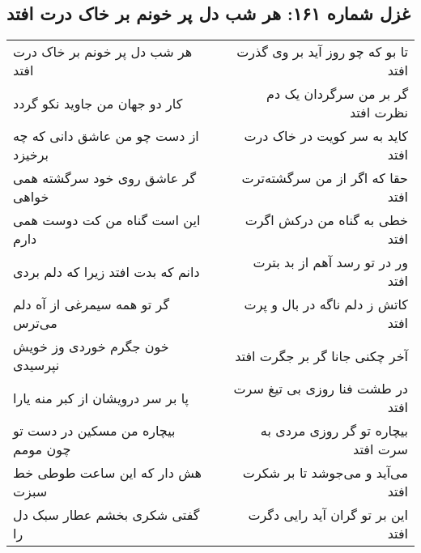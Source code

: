 \begin{center}
\section*{غزل شماره ۱۶۱: هر شب دل پر خونم بر خاک درت افتد}
\label{sec:161}
\begin{longtable}{l p{0.5cm} r}
هر شب دل پر خونم بر خاک درت افتد
&&
تا بو که چو روز آید بر وی گذرت افتد
\\
کار دو جهان من جاوید نکو گردد
&&
گر بر من سرگردان یک دم نظرت افتد
\\
از دست چو من عاشق دانی که چه برخیزد
&&
کاید به سر کویت در خاک درت افتد
\\
گر عاشق روی خود سرگشته همی خواهی
&&
حقا که اگر از من سرگشته‌ترت افتد
\\
این است گناه من کت دوست همی دارم
&&
خطی به گناه من درکش اگرت افتد
\\
دانم که بدت افتد زیرا که دلم بردی
&&
ور در تو رسد آهم از بد بترت افتد
\\
گر تو همه سیمرغی از آه دلم می‌ترس
&&
کاتش ز دلم ناگه در بال و پرت افتد
\\
خون جگرم خوردی وز خویش نپرسیدی
&&
آخر چکنی جانا گر بر جگرت افتد
\\
پا بر سر درویشان از کبر منه یارا
&&
در طشت فنا روزی بی تیغ سرت افتد
\\
بیچاره من مسکین در دست تو چون مومم
&&
بیچاره تو گر روزی مردی به سرت افتد
\\
هش دار که این ساعت طوطی خط سبزت
&&
می‌آید و می‌جوشد تا بر شکرت افتد
\\
گفتی شکری بخشم عطار سبک دل را
&&
این بر تو گران آید رایی دگرت افتد
\\
\end{longtable}
\end{center}
